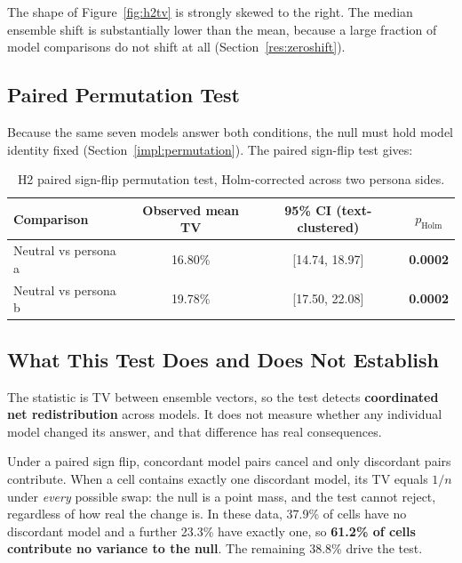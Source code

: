 The shape of Figure~\ref{fig:h2tv} is strongly skewed to the right. The median ensemble shift is
substantially lower than the mean, because a large fraction of model comparisons do not shift at all
(Section~\ref{res:zeroshift}).

\subsection{Paired Permutation Test}
\label{res:h2perm}

\noindent
Because the same seven models answer both conditions, the null must hold model identity fixed
(Section~\ref{impl:permutation}). The paired sign-flip test gives:

\begin{table}[h]
\centering
\footnotesize
\caption{H2 paired sign-flip permutation test, Holm-corrected across two persona sides.}
\label{tab:h2}
\begin{tabular}{lccc}
\hline
\textbf{Comparison} & \textbf{Observed mean TV} & \textbf{95\% CI (text-clustered)} & $p_{\text{Holm}}$ \\
\hline
Neutral vs persona a & 16.80\% & [14.74, 18.97] & \textbf{0.0002} \\
Neutral vs persona b & 19.78\% & [17.50, 22.08] & \textbf{0.0002} \\
\hline
\end{tabular}
\end{table}

\subsection{What This Test Does and Does Not Establish}
\label{res:h2scope}

\noindent
The statistic is TV between ensemble vectors, so the test detects \textbf{coordinated net
redistribution} across models. It does not measure whether any individual model changed its
answer, and that difference has real consequences.

Under a paired sign flip, concordant model pairs cancel and only discordant pairs contribute. When
a cell contains exactly one discordant model, its TV equals $1/n$ under \emph{every} possible
swap: the null is a point mass, and the test cannot reject, regardless of how real the change is. In these data, 37.9\% of cells have no discordant model and a further 23.3\%
have exactly one, so \textbf{61.2\% of cells contribute no variance to the null}. The remaining
38.8\% drive the test.

